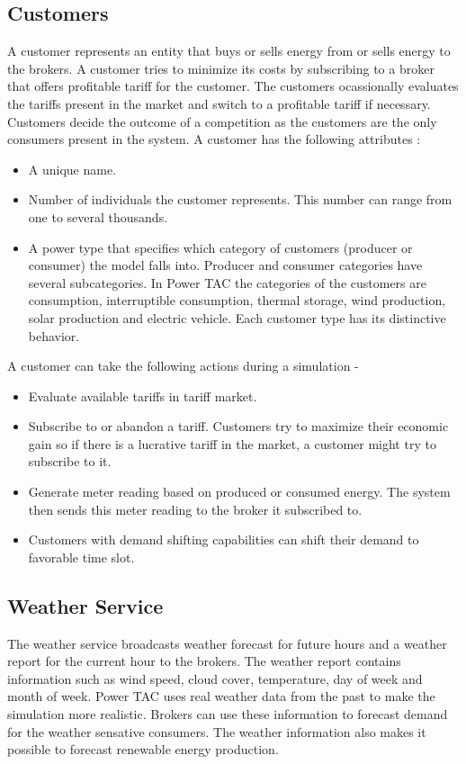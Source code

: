 \subsection{Customers}
A customer represents an entity that buys or sells energy from or sells energy to the brokers. A customer tries to minimize its costs by subscribing to a broker that offers profitable tariff for the customer. The customers ocassionally evaluates the tariffs present in the market and switch to a profitable tariff if necessary. Customers decide the outcome of a competition as the customers are the only consumers present in the system. A customer has the following attributes :
\begin{itemize}  
\item A unique name. 
\item Number of individuals the customer represents. This number can range from one to several thousands. 
\item A power type that specifies which category of customers (producer or consumer) the model falls into. Producer and consumer categories have several subcategories. In Power TAC the categories of the customers are consumption, interruptible consumption, thermal storage, wind production, solar production and electric vehicle. Each customer type has its distinctive behavior. 
\end{itemize}

A customer can take the following actions during a simulation - 
\begin{itemize}  
\item Evaluate available tariffs in tariff market.
\item Subscribe to or abandon a tariff. Customers try to maximize their economic gain so if there is a lucrative tariff in the market, a customer might try to subscribe to it.
\item Generate meter reading based on produced or consumed energy. The system then sends this meter reading to the broker it subscribed to. 
\item Customers with demand shifting capabilities can shift their demand to favorable time slot.
\end{itemize}
 

\subsection{Weather Service}
The weather service broadcasts weather forecast for future hours and a weather report for the current hour to the brokers. The weather report contains information such as wind speed, cloud cover, temperature, day of week and month of week. Power TAC uses real weather data from the past to make the simulation more realistic. Brokers can use these information to forecast demand for the weather sensative consumers. The weather information also makes it possible to forecast renewable energy production.

